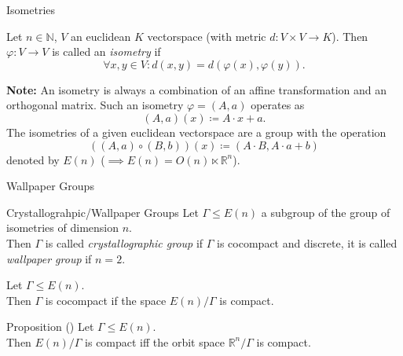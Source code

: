 \documentclass{beamer}
\numberwithin{equation}{aufgabe}
\newcommand\R{\mathbb R}
\newcommand\N{\mathbb N}
\renewcommand{\phi}{\varphi}
\begin{document}
\begin{frame}{Isometries}
    \begin{definition}
        Let $n \in \N$, $V$ an euclidean $K$ vectorspace (with metric $d: V \times V \to K$).
        Then $\phi: V \to V$ is called an \emph{isometry} if \pause
        $$
            \forall x, y \in V : d(x, y) = d(\phi(x), \phi(y)).
        $$
    \end{definition}
    \pause
    \textbf{Note:} An isometry is always a combination of an affine transformation and an orthogonal matrix. Such an isometry $\phi = (A, a)$ operates as 
    $$
        (A, a)(x) \coloneqq A \cdot x + a.
    $$
    \pause
    The isometries of a given euclidean vectorspace are a group with the operation 
    $$
        \left( (A, a) \circ (B, b) \right) (x) \coloneqq (A \cdot B, A\cdot a + b)
    $$
    denoted by $E(n)$ \pause ($ \implies E(n) = O(n) \ltimes \R^n$).
\end{frame}
\begin{frame}{Wallpaper Groups}
    \begin{definition}{Crystallograhpic/Wallpaper Groups}
        Let $\Gamma \leq E(n)$ a subgroup of the group of isometries of dimension $n$.\\
        Then $\Gamma$ is called \emph{crystallographic group} if $\Gamma$ is cocompact and discrete, it is called \emph{wallpaper group} if $n=2$.
    \end{definition}
    \pause
    \begin{definition}
        Let $\Gamma \leq E(n)$. \\
        Then $\Gamma$ is cocompact if the space $E(n) / \Gamma$ is compact.
    \end{definition}
    \pause
    \begin{block}{Proposition (\cite[Prop. 1.9]{szczepanski2012geometry})}
        Let $\Gamma \leq E(n)$. \\
        Then $E(n)/\Gamma$ is compact iff the orbit space $\R^n / \Gamma$ is compact.
    \end{block}
\end{frame}
\end{document}
